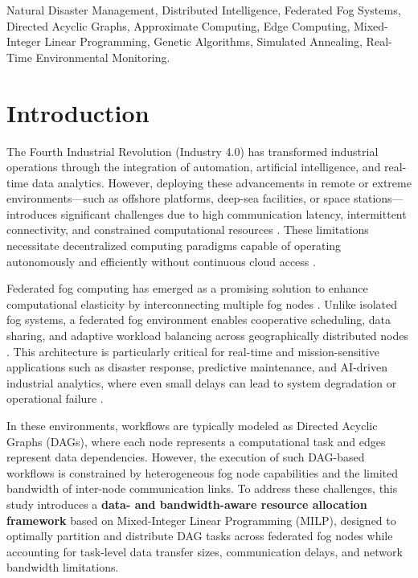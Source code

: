 \documentclass[conference]{IEEEtran}
\begin{document}
\begin{IEEEkeywords}
Natural Disaster Management, Distributed Intelligence, Federated Fog Systems, Directed Acyclic Graphs, Approximate Computing, Edge Computing, Mixed-Integer Linear Programming, Genetic Algorithms, Simulated Annealing, Real-Time Environmental Monitoring.
\end{IEEEkeywords}

\section{Introduction}

The Fourth Industrial Revolution (Industry 4.0) has transformed industrial operations through the integration of automation, artificial intelligence, and real-time data analytics. However, deploying these advancements in remote or extreme environments—such as offshore platforms, deep-sea facilities, or space stations—introduces significant challenges due to high communication latency, intermittent connectivity, and constrained computational resources \cite{wang2021adaptive}. These limitations necessitate decentralized computing paradigms capable of operating autonomously and efficiently without continuous cloud access \cite{dragoni2017microservices}.

Federated fog computing has emerged as a promising solution to enhance computational elasticity by interconnecting multiple fog nodes \cite{mattia2023fogcontrol}. Unlike isolated fog systems, a federated fog environment enables cooperative scheduling, data sharing, and adaptive workload balancing across geographically distributed nodes \cite{provisioning2023}. This architecture is particularly critical for real-time and mission-sensitive applications such as disaster response, predictive maintenance, and AI-driven industrial analytics, where even small delays can lead to system degradation or operational failure \cite{fgcs2024}.

In these environments, workflows are typically modeled as Directed Acyclic Graphs (DAGs), where each node represents a computational task and edges represent data dependencies. However, the execution of such DAG-based workflows is constrained by heterogeneous fog node capabilities and the limited bandwidth of inter-node communication links. To address these challenges, this study introduces a \textbf{data- and bandwidth-aware resource allocation framework} based on Mixed-Integer Linear Programming (MILP), designed to optimally partition and distribute DAG tasks across federated fog nodes while accounting for task-level data transfer sizes, communication delays, and network bandwidth limitations.
\end{document}
